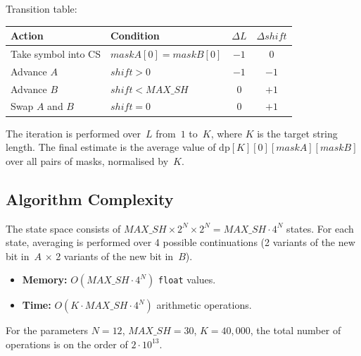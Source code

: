 \documentclass[12pt,a4paper]{article}
\begin{document}
Transition table:
\begin{center}
\begin{tabular}{llcc}
  \toprule
  \textbf{Action} & \textbf{Condition} & $\Delta L$ & $\Delta \mathit{shift}$ \\
  \midrule
  Take symbol into CS & $\mathit{maskA}[0] = \mathit{maskB}[0]$ & $-1$ & $0$ \\
  Advance $A$ & $\mathit{shift} > 0$ & $-1$ & $-1$ \\
  Advance $B$ & $\mathit{shift} < \mathit{MAX\_SH}$ & $0$ & $+1$ \\
  Swap $A$ and $B$ & $\mathit{shift} = 0$ & $0$ & $+1$ \\
  \bottomrule
\end{tabular}
\end{center}
The iteration is performed over~$L$ from~$1$ to~$K$, where $K$ is the target string length.
The final estimate is the average value of $\mathrm{dp}[K][0][\mathit{maskA}][\mathit{maskB}]$ over all pairs of masks, normalised by~$K$.

\subsection{Algorithm Complexity}
The state space consists of $\mathit{MAX\_SH} \times 2^N \times 2^N = \mathit{MAX\_SH} \cdot 4^N$ states.
For each state, averaging is performed over 4 possible continuations (2 variants of the new bit in~$A$ $\times$ 2 variants of the new bit in~$B$).
\begin{itemize}
  \item \textbf{Memory:} $O(\mathit{MAX\_SH} \cdot 4^N)$ \texttt{float} values.
  \item \textbf{Time:} $O(K \cdot \mathit{MAX\_SH} \cdot 4^N)$ arithmetic operations.
\end{itemize}
For the parameters $N = 12$, $\mathit{MAX\_SH} = 30$, $K = 40{,}000$, the total number of operations is on the order of $2 \cdot 10^{13}$.
\end{document}
